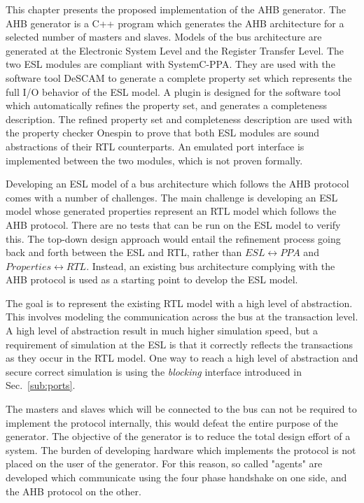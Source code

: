 \label{ch:impl}
This chapter presents the proposed implementation of the AHB generator. The AHB generator is a C++ program which generates the AHB architecture for a selected number of masters and slaves. Models of the bus architecture are generated at the Electronic System Level and the Register Transfer Level. The two ESL modules are compliant with SystemC-PPA. They are used with the software tool DeSCAM to generate a complete property set which represents the full I/O behavior of the ESL model. A plugin is designed for the software tool which automatically refines the property set, and generates a completeness description. The refined property set and completeness description are used with the property checker Onespin to prove that both ESL modules are sound abstractions of their RTL counterparts. An emulated port interface is implemented between the two modules, which is not proven formally. \par
Developing an ESL model of a bus architecture which follows the AHB protocol comes with a number of challenges. The main challenge is developing an ESL model whose generated properties represent an RTL model which follows the AHB protocol. There are no tests that can be run on the ESL model to verify this. The top-down design approach would entail the refinement process going back and forth between the ESL and RTL, rather than $ESL\leftrightarrow PPA$ and $Properties\leftrightarrow RTL$. Instead, an existing bus architecture complying with the AHB protocol is used as a starting point to develop the ESL model. \par
The goal is to represent the existing RTL model with a high level of abstraction. This involves modeling the communication across the bus at the transaction level. A high level of abstraction result in much higher simulation speed, but a requirement of simulation at the ESL is that it correctly reflects the transactions as they occur in the RTL model. One way to reach a high level of abstraction and secure correct simulation is using the \textit{blocking} interface introduced in Sec.~\ref{sub:ports}. \par
The masters and slaves which will be connected to the bus can not be required to implement the protocol internally, this would defeat the entire purpose of the generator. The objective of the generator is to reduce the total design effort of a system. The burden of developing hardware which implements the protocol is not placed on the user of the generator. For this reason, so called "agents" are developed which communicate using the four phase handshake on one side, and the AHB protocol on the other. \par 
  

